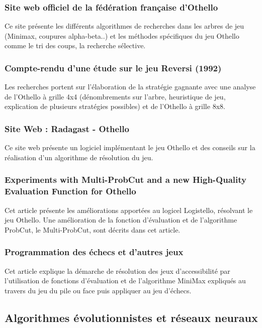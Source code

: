 \documentclass[a4paper,12pt]{article}
\begin{document}
\subsubsection{Site web officiel de la fédération française d'Othello}
Ce site \cite{1} présente les différents algorithmes de recherches
dans les arbres de jeu (Minimax, coupures alpha-beta..) et les
méthodes spécifiques du jeu Othello comme le tri des coups, la
recherche sélective.

\subsubsection{Compte-rendu d'une étude sur le jeu Reversi (1992)}
Les recherches \cite{6} portent sur l'élaboration de la stratégie
gagnante avec une analyse de l'Othello à grille 4x4 (dénombrements sur l'arbre,
heuristique de jeu, explication de plusieurs stratégies possibles) et
de l'Othello à grille 8x8.

\subsubsection{Site Web : Radagast - Othello}
Ce site web \cite{3} présente un logiciel implémentant le jeu Othello
et des conseils sur la réalisation d'un algorithme de résolution du
jeu.

\subsubsection{Experiments with Multi-ProbCut and a new High-Quality Evaluation Function for Othello}
Cet article \cite{8} présente les améliorations apportées
au logicel Logistello, résolvant le jeu Othello. Une
amélioration de la fonction d'évaluation et de l'algorithme
ProbCut, le Multi-ProbCut, sont décrits dans cet article.

\subsubsection{Programmation des échecs et d'autres jeux}
Cet article \cite{7} explique la démarche de résolution des
jeux d'accessibilité par l'utilisation de fonctions
d'évaluation et de l'algorithme MiniMax expliqués au travers
du jeu du pile ou face puis appliquer au jeu d'échecs.

\subsection{Algorithmes évolutionnistes et réseaux neuraux}
\end{document}
